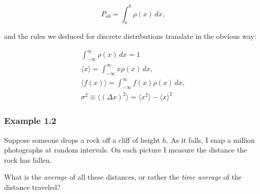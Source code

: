 \documentclass[svgnames]{article}   	%
\begin{document}
\vspace{5px} \[
  P_{ab} = \int_{a}^{b} \rho(x) \, dx,  
\] \vspace{5px}

and the rules we deduced for discrete distributions translate in the obvious
way: 

\begin{align*}
  \int_{-\infty}^{\infty} \rho(x) \, dx = 1 \\
  \langle x \rangle = \int_{-\infty}^{\infty}  x\rho(x)\,dx, \\
  \langle f(x) \rangle = \int_{-\infty}^{\infty}  f(x) \rho(x) \, dx, \\
  \sigma^2 \equiv \langle ( \Delta x)^2 \rangle = \langle x^2 \rangle - \langle
  x \rangle ^2
\end{align*}

\vspace{5px}

\subsubsection{Example 1.2}

Suppose someone drops a rock off a cliff of height $h$. As it falls, I snap
a million photographs at random intervals. On each picture I measure the
distance the rock has fallen. \\

\begin{tcolorbox}[colback = blue!5!white, colframe = blue!50!black, title
= Question]
What is the \textit{average} of all these distances, or rather the \textit{time
average} of the distance traveled? 
\end{tcolorbox} 
\end{document}
